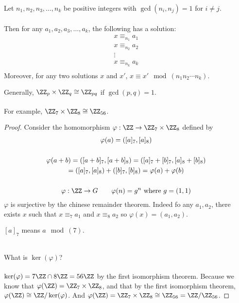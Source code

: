 \documentclass[class=scrartcl, crop=false]{standalone}
\begin{document}
\begin{theorem}
  Let $n_1, n_2, n_3, \dots, n_k$ be positive integers with $\gcd(n_i, n_j) = 1$ for $i \neq j$.
  \\\\
  Then for any $a_1, a_2, a_3, \dots, a_k$, the following has a solution:
  \begin{gather*}
    x \equiv_{n_1} a_1 \\
    x \equiv_{n_2} a_2 \\
    \vdots \\
    x \equiv_{n_k} a_k \\
  \end{gather*} 
  Moreover, for any two solutions $x$ and $x'$, $x \equiv x' \mod(n_1 n_2 \cdots n_k)$.
  \begin{example}
    Generally, $\ZZ_p \times \ZZ_q \cong \ZZ_{pq}$ if $\gcd(p, q) = 1$. \\\\
    For example, $\ZZ_7 \times \ZZ_8 \cong \ZZ_{56}$.
  \end{example} 
  \begin{proof}
    Consider the homomorphism $\varphi: \ZZ \to \ZZ_7 \times \ZZ_8$ defined by
    \begin{gather*}
      \varphi(a) = \left([a]_7, [a]_8\right)
      \\\\
      \varphi(a + b) = ([a + b]_7, [a + b]_8) = ([a]_7 + [b]_7, [a]_8 + [b]_8) \\
      = ([a]_7, [a]_8) + ([b]_7, [b]_8) = \varphi(a) + \varphi(b)
      \\\\
      \varphi: \ZZ \to G \qquad \varphi(n) = g^n \ \text{where} \ g = (1, 1)
    \end{gather*} 
    $\varphi$ is surjective by the chinese remainder theorem. Indeed fo any $a_1, a_2$, there exists $x$ such that $x \equiv_7 a_1$ and $x \equiv_8 a_2$ so $\varphi(x) = (a_1, a_2)$.
    \begin{note}
      $[a]_7$ means $a \mod(7)$.
    \end{note} \noindent
    \\
    What is $\ker(\varphi)$?
    \\\\
    $\ker(\varphi) = 7\ZZ \cap 8\ZZ = 56 \ZZ$ by the first isomorphism theorem. 
    Because we know that $\varphi(\ZZ) = \ZZ_7 \times \ZZ_8$, and that by the first isomorphism theorem, $\varphi(\ZZ) \cong \ZZ / \ker(\varphi)$. And $\varphi(\ZZ) = \ZZ_7 \times \ZZ_8 \cong \ZZ_{56} = \ZZ / \ZZ_{56}$.
  \end{proof} 
\end{theorem} 
\end{document}
